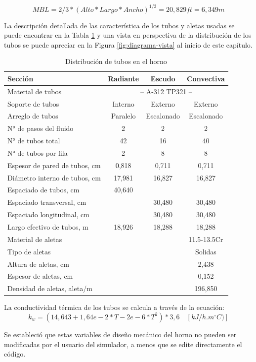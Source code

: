 \begin{equation} \label{eq:mbl}
    MBL = 2/3 * (Alto*Largo*Ancho)^{1/3} = 20,829ft = 6,349m
\end{equation}
\par La descripción detallada de las característica de los tubos y aletas usadas se puede encontrar en la Tabla \ref{tbl:tubes} y una vista en perspectiva de la distribución de los tubos se puede apreciar en la Figura \ref{fig:diagrama-vista} al inicio de este capítulo.
\begin{table}[hbt]
\begin{center}
\caption[Distribución de tubos en el horno]{Distribución de tubos en el horno}
\label{tbl:tubes}
\begin{tabular}{l|c|c|c}
Sección 					& Radiante	& Escudo		& Convectiva \\
\hline
Material de tubos			& \multicolumn{3}{c}{-- A-312 TP321 --} \\

Soporte de tubos    		& Interno	& Externo		& Externo		\\
Arreglo	de tubos    		& Paralelo	& Escalonado	& Escalonado	\\
N° de pasos del fluido		& 2	        & 2	            & 2	            \\
N° de tubos total    		& 42		& 16			& 40			\\
N° de tubos por fila		& 2			& 8				& 8				\\
Espesor de pared de tubos, cm	& 0,818		& 0,711			& 0,711			\\
Diámetro interno de tubos, cm	& 17,981	& 16,827		& 16,827		\\
Espaciado de tubos, cm  	& 40,640	& 				& 				\\
Espaciado transversal, cm  	&			& 30,480		& 30,480		\\
Espaciado longitudinal, cm 	&			& 30,480		& 30,480		\\
Largo efectivo de tubos, m	& 18,926    & 18,288		& 18,288		\\
\hline
Material de aletas			&			& 				& 11.5-13.5Cr	\\
Tipo de aletas				&			& 				& Solidas		\\	
Altura de aletas, cm		&			& 				& 2,438			\\
Espesor de aletas, cm		&			& 				& 0,152			\\
Densidad de aletas, aleta/m	&			& 				& 196,850		\\
\end{tabular} \end{center} \end{table}
\par La conductividad térmica de los tubos se calcula a través de la ecuación:
\begin{equation}
k_w = (14,643 + 1,64e-2*T - 2e-6*T^2)*3,6 \quad [kJ/h.m^{\circ} C)]
\end{equation}
\par Se estableció que estas variables de diseño mecánico del horno no pueden ser modificadas por el usuario del simulador, a menos que se edite directamente el código.

